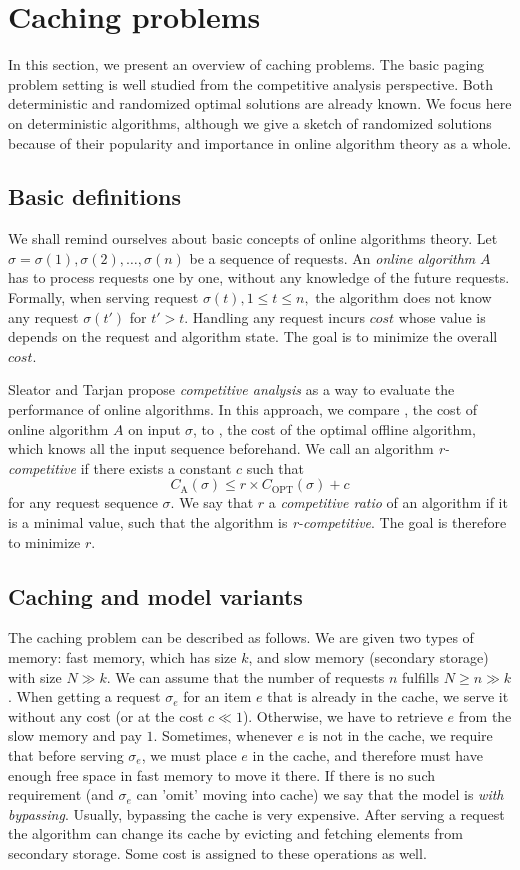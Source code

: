 \section{Caching problems}
\label{caching_problems}
In this section, we present an overview of caching problems. The basic paging 
problem setting is well studied from the competitive analysis perspective. 
Both deterministic and randomized optimal solutions are already known. We focus 
here on deterministic algorithms, although we give a sketch of randomized solutions 
because of their popularity and importance in online algorithm theory as a 
whole. 
\subsection{Basic definitions}
We shall remind ourselves about basic concepts of online algorithms theory. 
Let $\sigma = \sigma(1), \sigma(2), \ldots, \sigma(n)$ be a sequence of 
requests. An \textit{online algorithm} $A$ has to process requests one by one, 
without any knowledge of the future requests. Formally, when 
serving request 
$\sigma(t), 1 \leq t \leq n,$ the algorithm does not know any request 
$\sigma(t')$ for $t'>t$. Handling any request incurs $cost$ whose value is 
depends on the request and algorithm state. The goal is to minimize the overall 
$cost$.

Sleator and Tarjan \cite{tarjan} propose
\textit{competitive analysis} as a way to evaluate the performance of online 
algorithms. In this approach, we compare , the cost of online algorithm 
$A$ on input $\sigma$, to , the cost of the optimal offline algorithm, 
which knows all the input sequence beforehand. We call an algorithm 
\textit{r-competitive} if there exists a constant $c$ such that
$$C_{\mathrm{A}}(\sigma) \leq r \times C_{\mathrm{OPT}}(\sigma) + c$$
for any request sequence $\sigma$. We say that $r$ a \textit{competitive ratio}
of an algorithm if it is a minimal value, such that the algorithm is 
\textit{r-competitive}. The goal is therefore to minimize $r$.

\subsection{Caching and model variants}
The caching problem can be described as follows. We are given two types of memory: 
fast memory, which has size $k$, and slow memory (secondary storage) with size $N 
\gg k$. We can 
assume that the number of requests $n$ fulfills $N \geq n \gg k$. When getting a 
request $\sigma_{e}$ for an item $e$ that is already in the cache, we serve it 
without any cost (or at the cost $c \ll 1$). 
Otherwise, we have to retrieve $e$ from the slow memory and pay 
$1$. Sometimes, whenever $e$ is not in the cache, we require that before 
serving $\sigma_{e}$, we must place $e$ in the cache, and therefore must have 
enough free space in fast memory to move it there. If there is no such requirement 
(and $\sigma_{e}$ can 'omit' moving into cache) we say that the model is 
\textit{with bypassing}. Usually, bypassing the cache is very expensive. After serving 
a request the algorithm can change its cache by evicting and fetching elements 
from secondary storage. Some cost is assigned to these operations as well.

